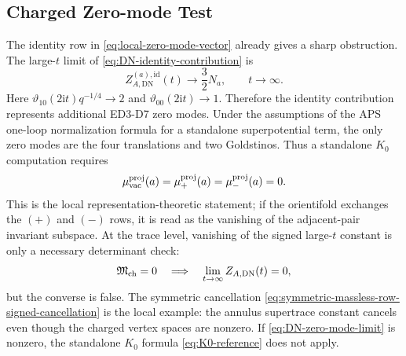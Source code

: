 \documentclass[11pt]{article}
\newcommand{\vac}{\mathrm{vac}}
\newcommand{\DN}{\mathrm{DN}}
\newcommand{\ii}{\mathrm{i}}
\newcommand{\vart}{\vartheta}
\begin{document}
\subsection{Charged Zero-mode Test}

The identity row in \eqref{eq:local-zero-mode-vector} already gives a sharp obstruction. The
large-$t$ limit of \eqref{eq:DN-identity-contribution} is
\begin{equation}
  Z_{A,\DN}^{(a),\mathrm{id}}(t)\longrightarrow \frac{3}{2}N_a,
  \qquad
  t\to\infty.
  \label{eq:DN-zero-mode-limit}
\end{equation}
Here $\vart_{10}(2\ii t)q^{-1/4}\to 2$ and $\vart_{00}(2\ii t)\to 1$. Therefore the identity
contribution represents additional ED3-D7 zero modes. Under the assumptions of the APS
one-loop normalization formula for a standalone superpotential term, the only zero modes are the
four translations and two Goldstinos. Thus a standalone \(K_0\) computation requires
\begin{equation}
  \mu_{\vac}^{\rm proj}(a)=\mu_+^{\rm proj}(a)=\mu_-^{\rm proj}(a)=0.
  \label{eq:no-charged-zero-mode-condition}
\end{equation}
This is the local representation-theoretic statement; if the orientifold exchanges the $(+)$ and
$(-)$ rows, it is read as the vanishing of the adjacent-pair invariant subspace.
At the trace level, vanishing of the signed large-\(t\) constant is only a necessary determinant
check:
\begin{equation}
  \mathfrak M_{\rm ch}=0
  \quad\Longrightarrow\quad
  \lim_{t\to\infty} Z_{A,\DN}(t)=0,
  \label{eq:signed-large-t-necessary-check}
\end{equation}
but the converse is false. The symmetric cancellation
\eqref{eq:symmetric-massless-row-signed-cancellation} is the local example: the annulus
supertrace constant cancels even though the charged vertex spaces are nonzero. If
\eqref{eq:DN-zero-mode-limit} is nonzero, the standalone \(K_0\) formula
\eqref{eq:K0-reference} does not apply.
\end{document}
